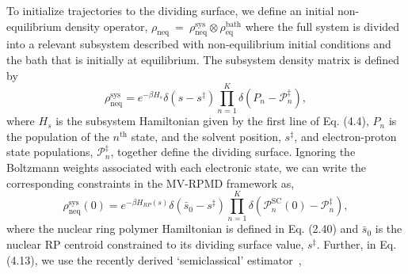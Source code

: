 \documentclass[phd,tocprelim]{cornell}
\begin{document}
To initialize trajectories to the dividing surface,
we define an initial non-equilibrium density operator,
$\rho_\textrm{neq}~=~\rho_\textrm{neq}^\textrm{sys}\otimes
\rho_\textrm{eq}^\textrm{bath}$ 
where the full system is divided into a relevant subsystem 
described with non-equilibrium initial conditions and the bath 
that is initially at equilibrium.
The subsystem density matrix is defined by
\begin{equation}
\rho_\textrm{neq}^\textrm{sys}=e^{-\beta H_s}
\delta(s-s^\ddagger)
\displaystyle\prod_{n=1}^K\delta
(P_n - \mathcal{P}_n^\ddagger),
    \label{eq:rsneq}
\end{equation}
where $H_s$ is the subsystem Hamiltonian given by the first line
of Eq. (4.4), $P_n$ is the population of the 
$n^\textrm{th}$ state, and the solvent position, $s^\ddag$, and 
electron-proton state populations, $\mathcal{P}_n^{\ddagger}$, 
together define the dividing surface.
Ignoring the Boltzmann weights associated with each 
electronic state, we can write the corresponding constraints 
in the MV-RPMD framework as,
\begin{equation}
    \rho_\textrm{neq}^\textrm{sys}(0)=e^{-\beta H_{RP}(s)}
    \delta(\bar s_0-s^\ddag) 
    \displaystyle\prod_{n=1}^K
    \delta(\mathcal{P}_n^{\textrm{SC}}(0)-\mathcal{P}_n^\ddagger),
    \label{eq:rneq}
\end{equation}
where the nuclear ring polymer Hamiltonian 
is defined in Eq. (2.40) and $\bar s_0$ 
is the nuclear RP centroid constrained 
to its dividing surface value, $s^\ddag$.
Further, in Eq. (4.13), we use
the recently derived `semiclassical' estimator~\cite{hel16}, 
\end{document}
